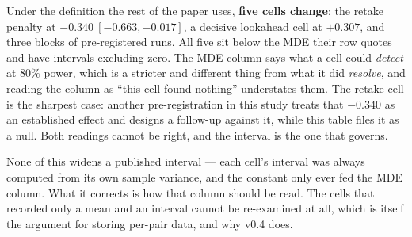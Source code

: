 \documentclass[11pt,a4paper]{article}
\begin{document}
Under the definition the rest of the paper uses, \textbf{five cells change}: the
retake penalty at $-0.340\ [-0.663, -0.017]$, a decisive lookahead cell at
$+0.307$, and three blocks of pre-registered runs. All five sit below the MDE
their row quotes and have intervals excluding zero. The MDE column says what a
cell could \emph{detect} at $80\%$ power, which is a stricter and different thing
from what it did \emph{resolve}, and reading the column as ``this cell found
nothing'' understates them. The retake cell is the sharpest case: another
pre-registration in this study treats that $-0.340$ as an established effect and
designs a follow-up against it, while this table files it as a null. Both
readings cannot be right, and the interval is the one that governs.

None of this widens a published interval --- each cell's interval was always
computed from its own sample variance, and the constant only ever fed the MDE
column. What it corrects is how that column should be read. The cells that
recorded only a mean and an interval cannot be re-examined at all, which is
itself the argument for storing per-pair data, and why v0.4 does.
\end{document}
